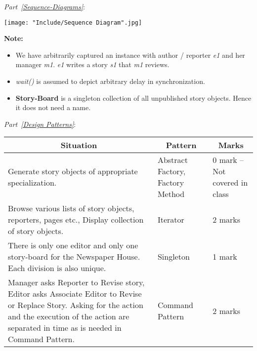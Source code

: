 \documentclass{article}
\begin{document}
\newpage
{\em Part~\ref{Sequence-Diagrams}}:

\begin{center}
\texttt{[image: "Include/Sequence Diagram".jpg]}
\end{center}

{\bf Note:}
\begin{itemize}
\item We have arbitrarily captured an instance with author / reporter {\em e1} and her manager {\em m1}. {\em e1} writes a story {\em s1} that {\em m1} reviews.

\item {\em wait()} is assumed to depict arbitrary delay in synchronization.

\item {\bf Story-Board} is a singleton collection of all unpublished story objects. Hence it does not need a name.
\end{itemize} 

\newpage
{\em Part~\ref{Design Patterns}}:
\begin{center}
\begin{scriptsize}
\begin{tabular}{|p{9cm}|p{2.3cm}|l|} \hline
\multicolumn{1}{|c}{\bf Situation} & \multicolumn{1}{|c}{\bf Pattern} & \multicolumn{1}{|c|}{\bf Marks} \\ \hline
Generate story objects of appropriate specialization. & Abstract Factory, Factory Method & 0 mark -- Not covered in class \\ \hline
Browse various lists of story objects, reporters, pages etc., Display collection of story objects. & Iterator & 2 marks \\ \hline
There is only one editor and only one story-board for the \textsf{Newspaper House}. Each division is also unique. & Singleton & 1 mark \\ \hline
Manager asks Reporter to Revise story, Editor asks Associate Editor to Revise or Replace Story. Asking for the action and the execution of the action are separated in time as is needed in Command Pattern. & Command Pattern & 2 marks \\ \hline
\end{tabular}
\end{scriptsize}
\end{center}
\end{document}
